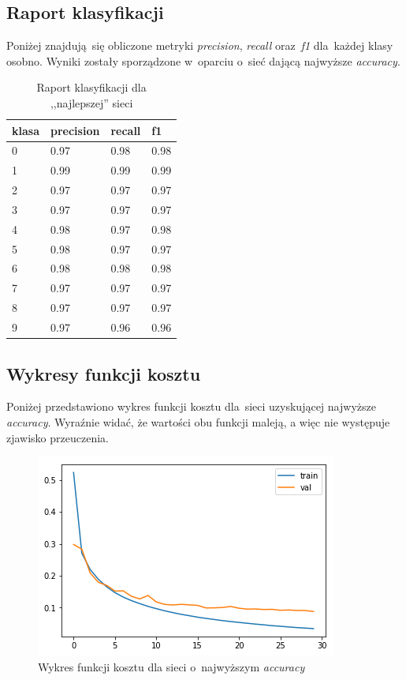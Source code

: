 \documentclass[11pt, a4paper]{article}
\begin{document}
\subsection{Raport klasyfikacji}
Poniżej znajdują~się obliczone metryki \textit{precision}, \textit{recall} oraz~\textit{f1} dla~każdej klasy osobno. Wyniki zostały sporządzone w~oparciu o~sieć dającą najwyższe \textit{accuracy}.

\begin{table}[H]
		\centering
    \begin{tabular}{llll}
    \textbf{klasa} & \textbf{precision} & \textbf{recall} & \textbf{f1} \\
    \hline
     0 & 0.97 &     0.98  &    0.98     \\
        1 &      0.99 &     0.99 &     0.99  \\
        2 &      0.97 &     0.97 &     0.97  \\
        3 &      0.97 &     0.97 &     0.97 \\ 
        4 &      0.98 &     0.97 &     0.98 \\
        5 &      0.98 &     0.97 &     0.97  \\ 
        6 &      0.98 &     0.98 &     0.98  \\ 
        7 &      0.97 &     0.97 &     0.97  \\ 
        8 &      0.97 &     0.97 &     0.97  \\ 
        9 &      0.97 &     0.96 &     0.96  \\
    \end{tabular}
    \caption{Raport klasyfikacji dla ,,najlepszej'' sieci}
\end{table}

\subsection{Wykresy funkcji kosztu}
Poniżej przedstawiono wykres funkcji kosztu dla~sieci uzyskującej najwyższe \textit{accuracy}. Wyraźnie widać, że wartości obu funkcji maleją, a więc nie występuje zjawisko przeuczenia.
\begin{figure}[H]
    \centering
    \includegraphics[scale=0.7]{funkcja_kosztu.png}
    \caption{Wykres funkcji kosztu dla sieci o~najwyższym \textit{accuracy}}
\end{figure}
\end{document}
